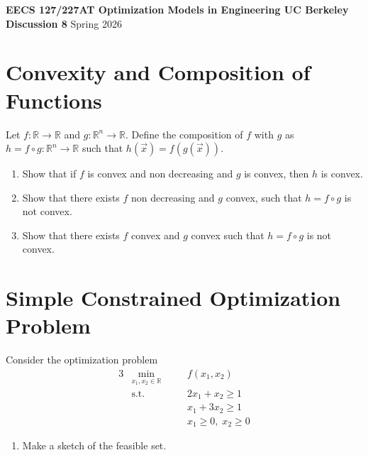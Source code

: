 \documentclass[10pt]{article}
\newcommand{\RR}{\mathbb{R}}
\begin{document}
\begin{center}
{\large\bfseries EECS 127/227AT \hfill Optimization Models in Engineering \hfill UC Berkeley}\\[4pt]
{\Large\bfseries Discussion 8} \hfill {\large Spring 2026}
\end{center}

\vspace{1em}

\section{Convexity and Composition of Functions}

Let $f : \RR \to \RR$ and $g : \RR^n \to \RR$. Define the composition of $f$ with $g$ as $h = f \circ g : \RR^n \to \RR$ such that
$h(\vec{x}) = f(g(\vec{x}))$.

\begin{enumerate}[label=(\alph*)]
    \item Show that if $f$ is convex and non decreasing and $g$ is convex, then $h$ is convex.

    \vspace{4cm}

    \item Show that there exists $f$ non decreasing and $g$ convex, such that $h = f \circ g$ is not convex.

    \vspace{4cm}

    \item Show that there exists $f$ convex and $g$ convex such that $h = f \circ g$ is not convex.
\end{enumerate}

\newpage

\section{Simple Constrained Optimization Problem}

Consider the optimization problem
\begin{alignat}{3}
    &\min_{x_1, x_2 \in \RR} &\quad& f(x_1, x_2) \\
    &\text{s.t.} && 2x_1 + x_2 \geq 1 \\
    &&& x_1 + 3x_2 \geq 1 \\
    &&& x_1 \geq 0,\; x_2 \geq 0
\end{alignat}

\begin{enumerate}[label=(\alph*)]
    \item Make a sketch of the feasible set.

    \vspace{4cm}
\end{enumerate}
\end{document}
